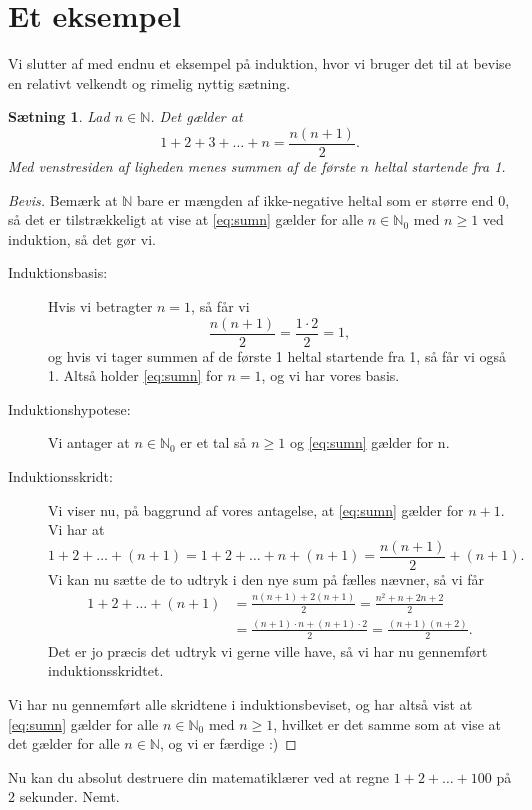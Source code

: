 \documentclass[a4paper, 12pt]{article}
\numberwithin{equation}{section}
\theoremstyle{plain}
\newtheorem{saetning}{Sætning}[section]
\theoremstyle{definition}
\newcommand{\N}{\mathbb{N}}
\begin{document}
\section{Et eksempel}
Vi slutter af med endnu et eksempel på induktion, hvor vi bruger det til at bevise en relativt velkendt og rimelig nyttig sætning.
\begin{saetning}
  Lad \(n\in\N\). Det gælder at
  \begin{equation}\label{eq:sumn}
    1+2+3+\dots+n=\frac{n(n+1)}{2}.
  \end{equation}
  Med venstresiden af ligheden menes summen af de første \(n\) heltal startende fra 1.
\end{saetning}
\begin{proof}[Bevis]
Bemærk at \(\N\) bare er mængden af ikke-negative heltal som er større end 0, så det er tilstrækkeligt at vise at \cref{eq:sumn} gælder for alle \(n\in\N_0\) med \(n\ge 1\) ved induktion, så det gør vi.
\begin{description}
\item[Induktionsbasis:] Hvis vi betragter \(n=1\), så får vi
  \[
    \frac{n(n+1)}{2}=\frac{1\cdot 2}{2}=1,
    \]
    og hvis vi tager summen af de første 1 heltal startende fra 1, så får vi også 1. Altså holder \cref{eq:sumn} for \(n=1\), og vi har vores basis.
  \item[Induktionshypotese:] Vi antager at \(n\in\N_0\) er et tal så \(n\ge 1\) og \cref{eq:sumn} gælder for n.
  \item[Induktionsskridt:] Vi viser nu, på baggrund af vores antagelse, at \cref{eq:sumn} gælder for \(n+1\). Vi har at
    \[
      1+2+\dots+(n+1)=1+2+\dots+n+(n+1)=\frac{n(n+1)}{2}+(n+1).
      \]
    Vi kan nu sætte de to udtryk i den nye sum på fælles nævner, så vi får
    \begin{align*}
      1+2+\dots+(n+1)&=\frac{n(n+1)+2(n+1)}{2}=\frac{n^2+n+2n+2}{2}\\
      &=\frac{(n+1)\cdot n+(n+1)\cdot 2}{2}=\frac{(n+1)(n+2)}{2}.
    \end{align*}
    Det er jo præcis det udtryk vi gerne ville have, så vi har nu gennemført induktionsskridtet.
\end{description}
Vi har nu gennemført alle skridtene i induktionsbeviset, og har altså vist at \cref{eq:sumn} gælder for alle \(n\in\N_0\) med \(n\ge 1\), hvilket er det samme som at vise at det gælder for alle \(n\in\N\), og vi er færdige :)
\end{proof}
Nu kan du absolut destruere din matematiklærer ved at regne \(1+2+\dots+100\) på 2 sekunder. Nemt.
\end{document}
